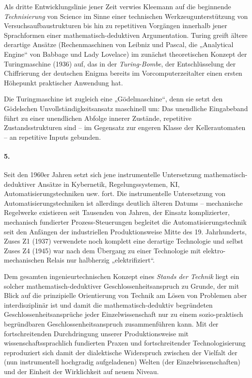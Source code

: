 \documentclass[11pt,a4paper]{article}
\begin{document}
Als dritte Entwicklungslinie jener Zeit verwies Kleemann auf die beginnende
\emph{Technisierung} von Science im Sinne einer technischen
Werkzeugunterstützung von Versuchsaufbaustrukturen bis hin zu repetitiven
Vorgängen innerhalb jener Sprachformen einer mathe\-matisch-deduktiven
Argumentation. Turing greift ältere derartige Ansätze (Rechenmaschinen von
Leibniz und Pascal, die „Analytical Engine“ von Babbage und Lady Lovelace) im
zunächst theoretischen Konzept der Turingmaschine (1936) auf, das in der
\emph{Turing-Bombe}, der Entschlüsselung der Chiffrierung der deutschen Enigma
bereits im Vorcomputerzeitalter einen ersten Höhepunkt praktischer Anwendung
hat.

Die Turingmaschine ist zugleich eine „Gödelmaschine“, denn sie setzt den
Gödelschen Unvollständigkeitsansatz maschinell um: Das unendliche Eingabeband
führt zu einer unendlichen Abfolge innerer Zustände, repetitive
Zustandsstrukturen sind -- im Gegensatz zur engeren Klasse der Kellerautomaten
-- an repetitive Inputs gebunden.

\paragraph{5.}
Seit den 1960er Jahren setzt sich jene instrumentelle Untersetzung
mathematisch-deduk\-tiver Ansätze in Kybernetik, Regelungssystemen, KI,
Automatisierungstechniken usw. fort. Die instrumentelle Untersetzung von
Automatisierungstechniken ist allerdings deutlich älteren Datums --
mechanische Regelwerke existieren seit Tausenden von Jahren, der Einsatz
komplizierter, mechanisch fundierter Prozess-Steuerungen begleitet die
Automatisierungstechnik seit den Anfängen der industriellen Produktionsweise
Mitte des 19. Jahrhunderts, Zuses Z1 (1937) verwendete noch komplett eine
derartige Technologie und selbst Zuses Z4 (1945) war nach dem Übergang zu
einer Technologie mit elektro-mechanischen Relais nur halbherzig
„elektrifiziert“.

Dem gesamten ingenieurtechnischen Konzept eines \emph{Stands der Technik}
liegt ein solcher mathe\-matisch-deduktiver Geschlossenheitsanspruch zu
Grunde, der mit Blick auf die prinzipielle Orientierung von Technik am Lösen
von Problemen aber interdisziplinär ist und damit die mathematisch-deduktiv
begründeten Geschlossenheitsansprüche jeder Einzelwissenschaft nur zu einem
sozio-praktisch begründbaren Geschlossenheitsanspruch zusammenführen kann. Mit
der fortschreitenden Durchdringung unserer Produktionsweise mit
wissenschaftssprachlich fundierten Praxen und fortschreitender
Technologisierung reproduziert sich damit der dialektische Widerspruch
zwischen der Vielfalt der (nun instrumentell hochgradig aufgeladenen) Welten
(der Einzelwissenschaften) und der Einheit der Wirklichkeit auf neuem Niveau.
\end{document}
